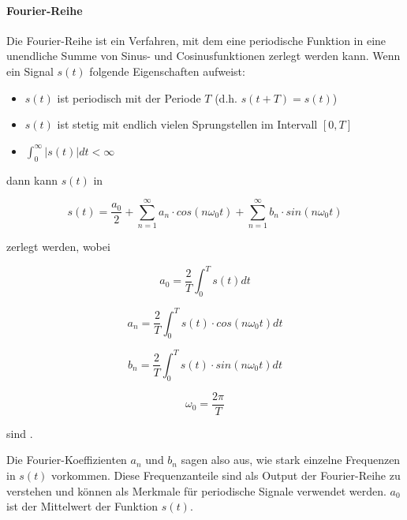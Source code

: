 \paragraph{Fourier-Reihe}


Die Fourier-Reihe ist ein Verfahren, mit dem eine periodische Funktion in eine unendliche Summe von Sinus- und Cosinusfunktionen zerlegt werden kann.
Wenn ein Signal $s(t)$ folgende Eigenschaften aufweist:

\begin{itemize}
    \item $s(t)$ ist periodisch mit der Periode $T$ (d.h. $s(t+T) = s(t)$)
    \item $s(t)$ ist stetig mit endlich vielen Sprungstellen im Intervall $[0,T]$
    \item $\int_{0}^{\infty} |s(t)| dt < \infty$
\end{itemize}

dann kann $s(t)$ in

\begin{equation}
s(t) = \frac{a_0}{2} + \sum_{n=1}^{\infty} a_n \cdot cos(n\omega_0t) + \sum_{n=1}^{\infty} b_n \cdot sin(n\omega_0t)
\end{equation}

zerlegt werden, wobei

\begin{equation}
a_0 = \frac{2}{T} \int_{0}^{T} s(t) dt
\end{equation}

\begin{equation}
a_n = \frac{2}{T} \int_{0}^{T} s(t) \cdot cos(n\omega_0t) dt
\end{equation}

\begin{equation}
b_n = \frac{2}{T} \int_{0}^{T} s(t) \cdot sin(n\omega_0t) dt
\end{equation}

\begin{equation}
\omega_0 = \frac{2\pi}{T}
\end{equation}

sind \autocite[vgl.][S. 19f]{ries_fourier-reihe_2018}.

Die Fourier-Koeffizienten $a_n$ und $b_n$ sagen also aus, wie stark einzelne Frequenzen in $s(t)$ vorkommen.
Diese Frequenzanteile sind als Output der Fourier-Reihe zu verstehen und können als Merkmale für periodische Signale verwendet werden.
$a_0$ ist der Mittelwert der Funktion $s(t)$.

